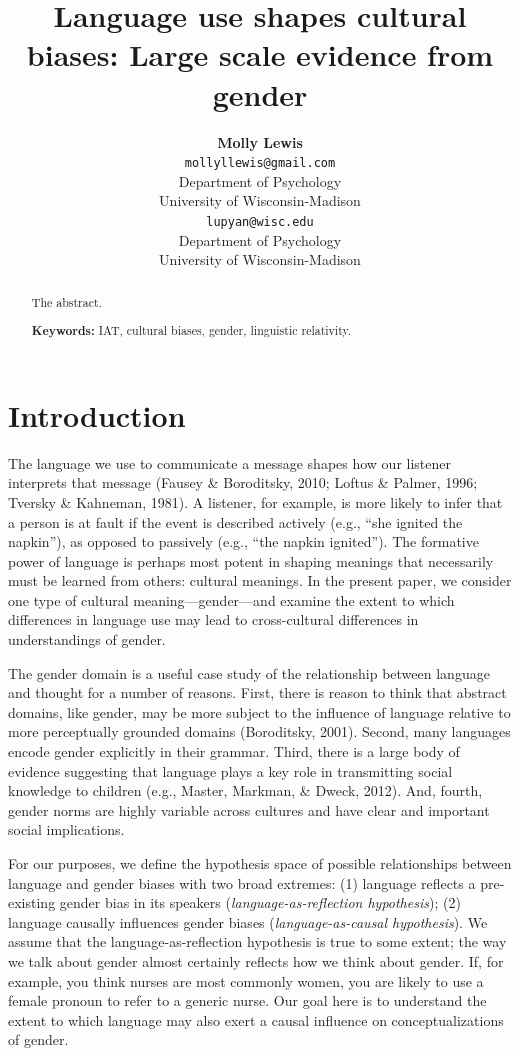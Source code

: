 \documentclass[10pt, letterpaper]{article}
\title{Language use shapes cultural biases: Large scale evidence from gender}
\author{{\large \bf Molly Lewis} \\ \texttt{mollyllewis@gmail.com} \\ Department of Psychology  \\ University of Wisconsin-Madison \And {\large \bf Gary Lupyan} \\ \texttt{lupyan@wisc.edu} \\ Department of Psychology  \\ University of Wisconsin-Madison}
\begin{document}
\maketitle

\begin{abstract}
The abstract.

\textbf{Keywords:}
IAT, cultural biases, gender, linguistic relativity.
\end{abstract}

\section{Introduction}\label{introduction}

The language we use to communicate a message shapes how our listener
interprets that message (Fausey \& Boroditsky, 2010; Loftus \& Palmer,
1996; Tversky \& Kahneman, 1981). A listener, for example, is more
likely to infer that a person is at fault if the event is described
actively (e.g., ``she ignited the napkin''), as opposed to passively
(e.g., ``the napkin ignited''). The formative power of language is
perhaps most potent in shaping meanings that necessarily must be learned
from others: cultural meanings. In the present paper, we consider one
type of cultural meaning---gender---and examine the extent to which
differences in language use may lead to cross-cultural differences in
understandings of gender.

The gender domain is a useful case study of the relationship between
language and thought for a number of reasons. First, there is reason to
think that abstract domains, like gender, may be more subject to the
influence of language relative to more perceptually grounded domains
(Boroditsky, 2001). Second, many languages encode gender explicitly in
their grammar. Third, there is a large body of evidence suggesting that
language plays a key role in transmitting social knowledge to children
(e.g., Master, Markman, \& Dweck, 2012). And, fourth, gender norms are
highly variable across cultures and have clear and important social
implications.

For our purposes, we define the hypothesis space of possible
relationships between language and gender biases with two broad
extremes: (1) language reflects a pre-existing gender bias in its
speakers (\emph{language-as-reflection hypothesis}); (2) language
causally influences gender biases (\emph{language-as-causal
hypothesis}). We assume that the language-as-reflection hypothesis is
true to some extent; the way we talk about gender almost certainly
reflects how we think about gender. If, for example, you think nurses
are most commonly women, you are likely to use a female pronoun to refer
to a generic nurse. Our goal here is to understand the extent to which
language may also exert a causal influence on conceptualizations of
gender.
\end{document}
